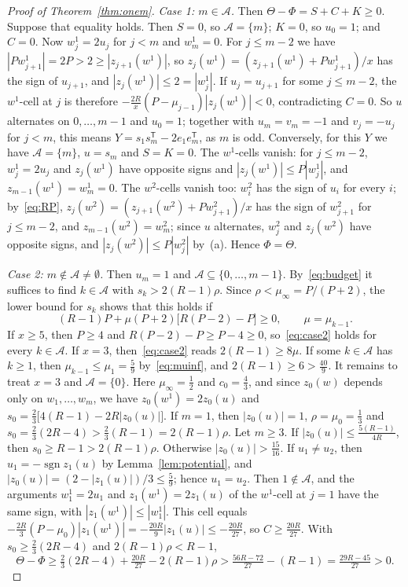 \documentclass[11pt]{article}
\theoremstyle{remark}
\begin{document}
\begin{proof}[Proof of Theorem~\ref{thm:onem}]
\emph{Case 1: $m\in\mathcal A$.} Then $\Theta-\Phi=S+C+K\ge0$. Suppose that
equality holds. Then $S=0$, so $\mathcal A=\{m\}$; $K=0$, so $u_0=1$; and
$C=0$. Now $w^1_j=2u_j$ for $j<m$ and $w^1_m=0$. For $j\le m-2$ we have
$|Pw^1_{j+1}|=2P>2\ge|z_{j+1}(w^1)|$, so
$z_j(w^1)=(z_{j+1}(w^1)+Pw^1_{j+1})/x$ has the sign of $u_{j+1}$, and
$|z_j(w^1)|\le2=|w^1_j|$. If $u_j=u_{j+1}$ for some $j\le m-2$, the
$w^1$-cell at $j$ is therefore $-\frac{2R}x(P-\mu_{j-1})|z_j(w^1)|<0$,
contradicting $C=0$. So $u$ alternates on $0,\dots,m-1$ and $u_0=1$; together
with $u_m=v_m=-1$ and $v_j=-u_j$ for $j<m$, this means
$Y=s_1s_m^{\mathsf T}-2e_1e_m^{\mathsf T}$, as $m$ is odd. Conversely, for
this $Y$ we have $\mathcal A=\{m\}$, $u=s_m$ and $S=K=0$. The $w^1$-cells
vanish: for $j\le m-2$, $w^1_j=2u_j$ and $z_j(w^1)$ have opposite signs and
$|z_j(w^1)|\le P|w^1_j|$, and $z_{m-1}(w^1)=w^1_m=0$. The $w^2$-cells vanish
too: $w^2_i$ has the sign of $u_i$ for every $i$; by~\eqref{eq:RP},
$z_j(w^2)=(z_{j+1}(w^2)+Pw^2_{j+1})/x$ has the sign of $w^2_{j+1}$ for
$j\le m-2$, and $z_{m-1}(w^2)=w^2_m$; since $u$ alternates, $w^2_j$ and
$z_j(w^2)$ have opposite signs, and $|z_j(w^2)|\le P|w^2_j|$ by~(a). Hence
$\Phi=\Theta$.

\emph{Case 2: $m\notin\mathcal A\ne\emptyset$.} Then $u_m=1$ and
$\mathcal A\subseteq\{0,\dots,m-1\}$. By~\eqref{eq:budget} it suffices to
find $k\in\mathcal A$ with $s_k>2(R-1)\rho$. Since
$\rho<\mu_\infty=P/(P+2)$, the lower bound for $s_k$ shows that this holds
if
\begin{equation}\label{eq:case2}
(R-1)P+\mu(P+2)\bigl[R(P-2)-P\bigr]\ge0,\qquad \mu=\mu_{k-1}.
\end{equation}
If $x\ge5$, then $P\ge4$ and $R(P-2)-P\ge P-4\ge0$, so~\eqref{eq:case2}
holds for every $k\in\mathcal A$. If $x=3$, then~\eqref{eq:case2} reads
$2(R-1)\ge8\mu$. If some $k\in\mathcal A$ has $k\ge1$, then
$\mu_{k-1}\le\mu_1=\frac59$ by~\eqref{eq:muinf}, and
$2(R-1)\ge6>\frac{40}9$. It remains to treat $x=3$ and $\mathcal A=\{0\}$.
Here $\mu_\infty=\frac12$ and $c_0=\frac43$, and since $z_0(w)$ depends only
on $w_1,\dots,w_m$, we have $z_0(w^1)=2z_0(u)$ and
$s_0=\frac23\bigl[4(R-1)-2R|z_0(u)|\bigr]$. If $m=1$, then $|z_0(u)|=1$,
$\rho=\mu_0=\frac13$ and $s_0=\frac23(2R-4)>\frac23(R-1)=2(R-1)\rho$. Let
$m\ge3$. If $|z_0(u)|\le\frac{5(R-1)}{4R}$, then $s_0\ge R-1>2(R-1)\rho$.
Otherwise $|z_0(u)|>\frac{15}{16}$. If $u_1\ne u_2$, then
$u_1=-\operatorname{sgn}z_1(u)$ by Lemma~\ref{lem:potential}, and
$|z_0(u)|=(2-|z_1(u)|)/3\le\frac59$; hence $u_1=u_2$. Then
$1\notin\mathcal A$, and the arguments $w^1_1=2u_1$ and $z_1(w^1)=2z_1(u)$ of
the $w^1$-cell at $j=1$ have the same sign, with $|z_1(w^1)|\le|w^1_1|$. This
cell equals
$-\frac{2R}3(P-\mu_0)|z_1(w^1)|=-\frac{20R}9|z_1(u)|\le-\frac{20R}{27}$, so
$C\ge\frac{20R}{27}$. With $s_0\ge\frac23(2R-4)$ and $2(R-1)\rho<R-1$,
\[
\Theta-\Phi\ge\tfrac23(2R-4)+\tfrac{20R}{27}-2(R-1)\rho
>\tfrac{56R-72}{27}-(R-1)=\tfrac{29R-45}{27}>0.
\]


\end{proof}
\end{document}
